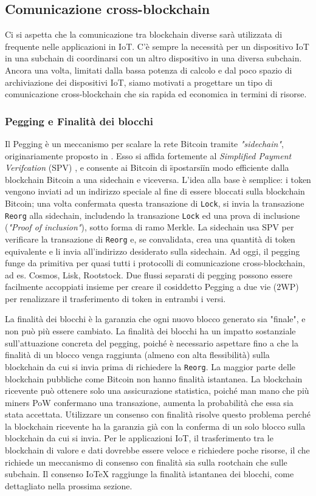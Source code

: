 \subsection{Comunicazione cross-blockchain}
Ci si aspetta che la comunicazione tra blockchain diverse sarà utilizzata di frequente nelle applicazioni in IoT. C'è sempre la necessità per un dispositivo IoT in una subchain di coordinarsi con un altro dispositivo in una diversa subchain. Ancora una volta, limitati dalla bassa potenza di calcolo e dal poco spazio di archiviazione dei dispositivi IoT, siamo motivati a progettare un tipo di comunicazione cross-blockchain che sia rapida ed economica in termini di risorse.

\subsubsection{Pegging e Finalità dei blocchi}
Il Pegging è un meccanismo per scalare la rete Bitcoin tramite \emph{"sidechain"}, originariamente
proposto in \cite{c1}. Esso si affida fortemente al \emph{Simplified Payment Verifcation} (SPV) \cite{c21}, e consente ai Bitcoin di \"spostarsi\" in modo efficiente dalla blockchain Bitcoin a una sidechain
e viceversa. L'idea alla base è semplice: i token vengono inviati ad un indirizzo speciale al fine di essere bloccati sulla blockchain Bitcoin; una volta confermata questa transazione di \texttt{Lock}, si invia la transazione \texttt{Reorg} alla sidechain, includendo la transazione \texttt{Lock} ed una
prova di inclusione (\emph{"Proof of inclusion"}), sotto forma di ramo Merkle. La sidechain usa SPV per verificare la transazione di \texttt{Reorg} e, se convalidata, crea una quantità di token equivalente e li invia all'indirizzo desiderato sulla sidechain. Ad oggi, il pegging funge da
primitiva per quasi tutti i protocolli di comunicazione cross-blockchain, ad es. Cosmos, Lisk,
Rootstock. Due flussi separati di pegging possono essere facilmente accoppiati insieme per creare il
cosiddetto Pegging a due vie (2WP) per renalizzare il trasferimento di token in entrambi i versi.

La finalità dei blocchi è la garanzia che ogni nuovo blocco generato sia "finale", e non può più essere
cambiato. La finalità dei blocchi ha un impatto sostanziale sull'attuazione concreta del pegging,
poiché è necessario aspettare fino a che la finalità di un blocco venga raggiunta (almeno con alta flessibilità) sulla blockchain da cui si invia prima di richiedere la \texttt{Reorg}. La maggior parte delle blockchain pubbliche come Bitcoin non hanno finalità istantanea. La blockchain ricevente può ottenere solo una assicurazione statistica, poiché man mano che più miners PoW confermano una transazione, aumenta la probabilità che essa sia stata accettata. Utilizzare un consenso con finalità risolve questo problema perché la blockchain ricevente ha la garanzia già con la conferma di un solo blocco sulla blockchain da cui si invia. Per le applicazioni IoT, il trasferimento tra le blockchain di valore e dati dovrebbe essere veloce e richiedere poche risorse, il che richiede un meccanismo di consenso con finalità sia sulla rootchain che sulle subchain. Il consenso IoTeX raggiunge la finalità istantanea dei blocchi, come dettagliato nella prossima sezione.

